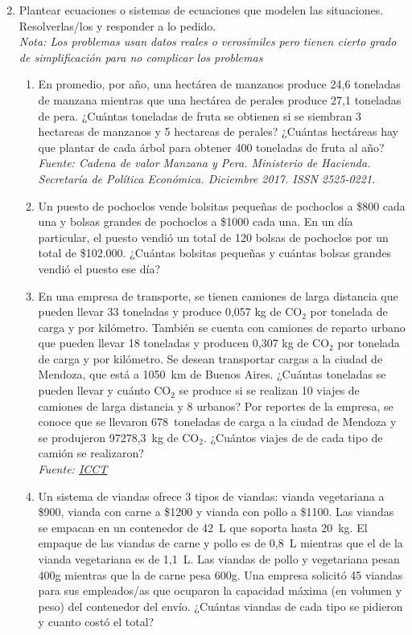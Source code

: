 \documentclass[a4paper]{article}
\newcommand{\exercise}{\item}
\begin{document}
\begin{enumerate}
\begin{multicols}{2}
		\end{multicols}
	\exercise Plantear ecuaciones o sistemas de ecuaciones que modelen las situaciones. Resolverlas/los y responder a lo pedido. \\ \textit{Nota: Los problemas usan datos reales o verosímiles pero tienen cierto grado de simplificación para no complicar los problemas}
	\begin{enumerate} [label=(\alph*)]
		\item En promedio, por año, una hectárea de manzanos produce 24,6 toneladas de manzana mientras que una hectárea de perales produce 27,1 toneladas de pera. ¿Cuántas toneladas de fruta se obtienen si se siembran 3 hectareas de manzanos y 5 hectareas de perales? ¿Cuántas hectáreas hay que plantar de cada árbol para obtener 400 toneladas de fruta al año? \\ \textit{Fuente: Cadena de valor Manzana y Pera. Ministerio de Hacienda. Secretaría de Política Económica. Diciembre 2017. ISSN 2525-0221.}
		\item Un puesto de pochoclos vende bolsitas pequeñas de pochoclos a \$800 cada una y bolsas grandes de pochoclos a \$1000 cada una. En un día particular, el puesto vendió un total de 120 bolsas de pochoclos por un total de \$102.000. ¿Cuántas bolsitas pequeñas y cuántas bolsas grandes vendió el puesto ese día?
		\item En una empresa de transporte, se tienen camiones de larga distancia que pueden llevar 33 toneladas y produce 0,057 kg de CO$_2$ por tonelada de carga y por kilómetro. También se cuenta con camiones de reparto urbano que pueden llevar 18 toneladas y producen 0,307 kg de CO$_2$ por tonelada de carga y por kilómetro. Se desean transportar cargas a la ciudad de Mendoza, que está a 1050~km de Buenos Aires. ¿Cuántas toneladas se pueden llevar y cuánto CO$_2$ se produce si se realizan 10 viajes de camiones de larga distancia y 8 urbanos? Por reportes de la empresa, se conoce que se llevaron 678~toneladas de carga a la ciudad de Mendoza y se produjeron 97278,3~kg de CO$_2$. ¿Cuántos viajes de de cada tipo de camión se realizaron? \\ \textit{Fuente: \href{https://theicct.org/publication/co2-emissions-from-trucks-in-the-eu-an-analysis-of-the-heavy-duty-co2-standards-baseline-data/}{ICCT}}
		\item Un sistema de viandas ofrece 3 tipos de viandas: vianda vegetariana a \$900, vianda con carne a \$1200 y vianda con pollo a \$1100.  Las viandas se empacan en un contenedor de 42~L que soporta hasta 20~kg. El empaque de las viandas de carne y pollo es de 0,8~L mientras que el de la vianda vegetariana es de 1,1~L. Las viandas de pollo y vegetariana pesan 400g mientras que la de carne pesa 600g. Una empresa solicitó 45 viandas para sus empleados/as que ocuparon la capacidad máxima (en volumen y peso) del contenedor del envío. ¿Cuántas viandas de cada tipo se pidieron y cuanto costó el total?

\end{enumerate}
\end{enumerate}
\end{document}
